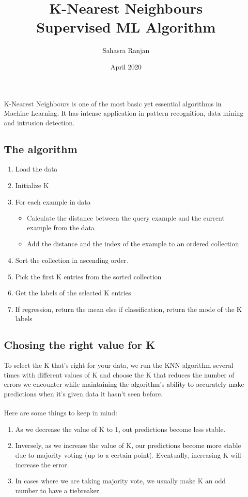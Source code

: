 \documentclass[12pt, A4]{report}
\title{\textbf{K-Nearest Neighbours}\\ \large{Supervised ML Algorithm}}
\author{Sahasra Ranjan}
\date{April 2020}
\begin{document}
\begin{titlepage}
\maketitle
\end{titlepage}

K-Nearest Neighbours is one of the most basic yet essential algorithms in Machine Learning. It has intense application in pattern recognition, data mining and intrusion detection.

\subsection*{The algorithm}
	\begin{enumerate}
		\item Load the data
		\item Initialize K
		\item For each example in data
		\begin{itemize}
			\item Calculate the distance between the query example and the current example from the data
			\item Add the distance and the index of the example to an ordered collection
		\end{itemize}
		\item Sort the collection in ascending order.
		\item Pick the first K entries from the sorted collection
		\item Get the labels of the selected K entries
		\item If regression, return the mean else if classification, return the mode of the K labels
	\end{enumerate}

\subsection*{Chosing the right value for K}
	To select the K that’s right for your data, we run the KNN algorithm several times with different values of K and choose the K that reduces the number of errors we encounter while maintaining the algorithm’s ability to accurately make predictions when it’s given data it hasn’t seen before.\\ \\
	Here are some things to keep in mind:
	\begin{enumerate}
		\item As we decrease the value of K to 1, out predictions become less stable.
		\item Inversely, as we increase the value of K, our predictions become more stable due to majority voting (up to a certain point). Eventually, increasing K will increase the error.
		\item In cases where we are taking majority vote, we usually make K an odd number to have a tiebreaker. 
	\end{enumerate}
\end{document}
